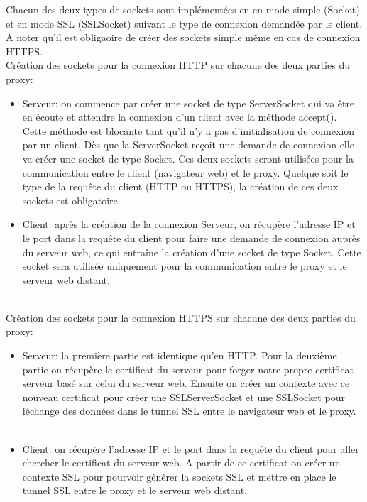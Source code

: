 \documentclass[a4paper,11pt,french]{report}
\begin{document}
Chacun des deux types de sockets sont implémentées en en mode simple (Socket) et 
en mode SSL (SSLSocket) suivant le type de connexion demandée par le client. A 
noter qu'il est obligaoire de créer des sockets simple même en cas de connexion 
HTTPS.
~~\\

Création des sockets pour la connexion HTTP sur chacune des deux parties du proxy:
\begin{itemize}
  \item Serveur: on commence par créer une socket de type ServerSocket qui va 
  être en écoute et attendre la connexion d'un client avec la méthode accept(). 
  Cette méthode est blocante tant qu'il n'y a pas d'initialisation de connexion 
  par un client. Dès que la ServerSocket reçoit une demande de connexion
  elle va créer une socket de type Socket. Ces deux sockets seront utilisées pour la communication entre le client (navigateur web) et le proxy.
  Quelque soit le type de la requête du client (HTTP ou HTTPS), la 
  création de ces deux sockets est obligatoire.~~\\
  
  \item Client: après la création de la connexion Serveur, on récupère 
  l'adresse IP et le port dans la requête du client pour faire une demande de 
  connexion auprès du serveur web, ce qui entraîne la création d'une socket de 
  type Socket. Cette socket sera utilisée uniquement pour la communication entre 
  le proxy et le serveur web distant. 
\end{itemize}
~~\\

Création des sockets pour la connexion HTTPS sur chacune des deux parties du proxy:
\begin{itemize}
  \item Serveur: la première partie est identique qu'en HTTP. Pour la deuxième 
  partie on récupère le certificat du serveur pour forger notre propre 
  certificat serveur basé sur celui du serveur web. Ensuite on créer un contexte 
  avec ce nouveau certificat pour créer une SSLServerSocket et une SSLSocket 
  pour léchange des données dans le tunnel SSL entre le navigateur web et le 
  proxy. ~~\\
  
  \item Client: on récupère l'adresse IP et le port dans la requête du client 
  pour aller chercher le certificat du serveur web. A partir de ce certificat on 
  créer un contexte SSL pour pourvoir générer la sockets SSL et mettre en place 
  le tunnel SSL entre le proxy et le serveur web distant.
\end{itemize}
\end{document}
